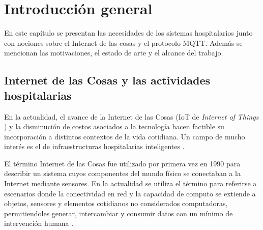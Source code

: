 
\chapter{Introducción general} %

\label{Chapter1} %
\label{IntroGeneral}
En este capítulo se presentan las necesidades de los sistemas hospitalarios junto con nociones sobre el Internet de las cosas y el protocolo MQTT. Además se mencionan las motivaciones, el estado de arte y el alcance del trabajo.

\newcommand{\keyword}[1]{\textbf{#1}}
\newcommand{\tabhead}[1]{\textbf{#1}}
\newcommand{\code}[1]{\texttt{#1}}
\newcommand{\file}[1]{\texttt{\bfseries#1}}
\newcommand{\option}[1]{\texttt{\itshape#1}}
\newcommand{\grados}{$^{\circ}$}



\section{Internet de las Cosas y las actividades hospitalarias}

En la actualidad, el avance de la Internet de las Cosas (IoT de \textit{Internet of Things} ) y la disminución de costos asociados a la tecnología hacen factible su incorporación a distintos contextos de la vida cotidiana. Un campo de mucho interés es el de infraestructuras hospitalarias inteligentes \citep{ARTICLE:1}.

El término Internet de las Cosas fue utilizado por primera vez en 1990 para describir un sistema cuyos componentes del mundo físico se conectaban a la Internet mediante sensores. En la actualidad se utiliza el término para referirse a escenarios donde la conectividad en red y la capacidad de computo se extiende a objetos, sensores y elementos cotidianos no considerados computadoras, permitiendoles generar, intercambiar y consumir datos con un mínimo de intervención humana \citep{ARTICLE:3}.


